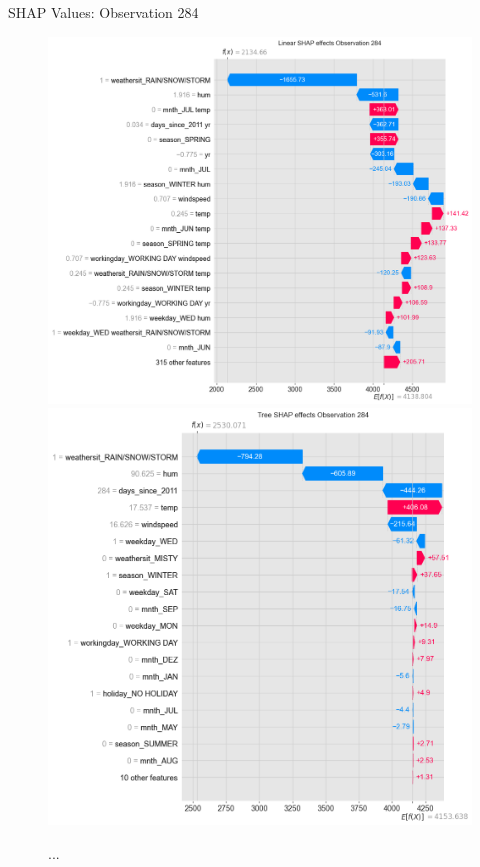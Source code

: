 \documentclass[10pt]{beamer}
\begin{document}
\begin{frame}{SHAP Values: Observation 284}
\begin{center}
  \begin{figure}
    \includegraphics[scale=0.19]{images/interpretable_ml_122_0.png}
    \includegraphics[scale=0.19]{images/interpretable_ml_134_0.png}
    \caption{ ... }
  \end{figure}
\end{center}
\end{frame}
\end{document}
